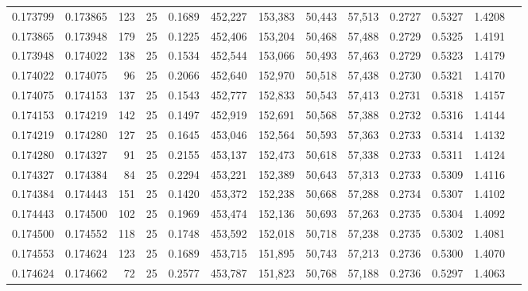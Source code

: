 \begin{tabular}{rrrrrrrrrrrrr}
0.173799 & 0.173865 &   123 &  25 &                                     0.1689 & 452,227 & 153,383 &  50,443 &  57,513 & 0.2727 & 0.5327 & 1.4208 \\
0.173865 & 0.173948 &   179 &  25 &                                     0.1225 & 452,406 & 153,204 &  50,468 &  57,488 & 0.2729 & 0.5325 & 1.4191 \\
0.173948 & 0.174022 &   138 &  25 &                                     0.1534 & 452,544 & 153,066 &  50,493 &  57,463 & 0.2729 & 0.5323 & 1.4179 \\
0.174022 & 0.174075 &    96 &  25 &                                     0.2066 & 452,640 & 152,970 &  50,518 &  57,438 & 0.2730 & 0.5321 & 1.4170 \\
0.174075 & 0.174153 &   137 &  25 &                                     0.1543 & 452,777 & 152,833 &  50,543 &  57,413 & 0.2731 & 0.5318 & 1.4157 \\
0.174153 & 0.174219 &   142 &  25 &                                     0.1497 & 452,919 & 152,691 &  50,568 &  57,388 & 0.2732 & 0.5316 & 1.4144 \\
0.174219 & 0.174280 &   127 &  25 &                                     0.1645 & 453,046 & 152,564 &  50,593 &  57,363 & 0.2733 & 0.5314 & 1.4132 \\
0.174280 & 0.174327 &    91 &  25 &                                     0.2155 & 453,137 & 152,473 &  50,618 &  57,338 & 0.2733 & 0.5311 & 1.4124 \\
0.174327 & 0.174384 &    84 &  25 &                                     0.2294 & 453,221 & 152,389 &  50,643 &  57,313 & 0.2733 & 0.5309 & 1.4116 \\
0.174384 & 0.174443 &   151 &  25 &                                     0.1420 & 453,372 & 152,238 &  50,668 &  57,288 & 0.2734 & 0.5307 & 1.4102 \\
0.174443 & 0.174500 &   102 &  25 &                                     0.1969 & 453,474 & 152,136 &  50,693 &  57,263 & 0.2735 & 0.5304 & 1.4092 \\
0.174500 & 0.174552 &   118 &  25 &                                     0.1748 & 453,592 & 152,018 &  50,718 &  57,238 & 0.2735 & 0.5302 & 1.4081 \\
0.174553 & 0.174624 &   123 &  25 &                                     0.1689 & 453,715 & 151,895 &  50,743 &  57,213 & 0.2736 & 0.5300 & 1.4070 \\
0.174624 & 0.174662 &    72 &  25 &                                     0.2577 & 453,787 & 151,823 &  50,768 &  57,188 & 0.2736 & 0.5297 & 1.4063 \\

\end{tabular}
